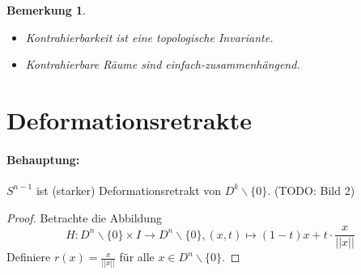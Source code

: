 \documentclass[a4paper,11pt,notitlepage]{report}
\newtheorem{remark}{Bemerkung}[chapter]
\begin{document}
\begin{remark}
	$ $
	\begin{itemize}
		\item Kontrahierbarkeit ist eine topologische Invariante.
		\item Kontrahierbare Räume sind einfach-zusammenhängend.
	\end{itemize}
\end{remark}

\section{Deformationsretrakte}
\paragraph{Behauptung:} $S^{n-1}$ ist (starker) Deformationsretrakt von $D^k\backslash \{0\}$. (TODO: Bild 2)

\begin{proof}
	Betrachte die Abbildung $$H \colon D^n \backslash \{0\} \times I \rightarrow D^n \backslash \{0\}, (x,t) \mapsto (1-t)x + t \cdot \frac{x}{||x||}$$
	Definiere $r(x)= \frac{x}{||x||}$ für alle $x \in D^n \backslash \{0\}$.
\end{proof}
\end{document}
